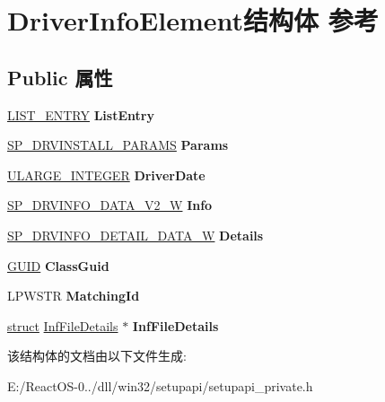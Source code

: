 \hypertarget{struct_driver_info_element}{}\section{Driver\+Info\+Element结构体 参考}
\label{struct_driver_info_element}
\subsection*{Public 属性}
\begin{DoxyCompactItemize}
\item 
\mbox{\label{struct_driver_info_element_a5f227b2496b84536b54402f8da7ff201}} 
\hyperlink{struct___l_i_s_t___e_n_t_r_y}{L\+I\+S\+T\+\_\+\+E\+N\+T\+RY} {\bfseries List\+Entry}
\item 
\mbox{\label{struct_driver_info_element_a9e860a7a714109bc65b21bc94cba1f00}} 
\hyperlink{struct___s_p___d_r_v_i_n_s_t_a_l_l___p_a_r_a_m_s}{S\+P\+\_\+\+D\+R\+V\+I\+N\+S\+T\+A\+L\+L\+\_\+\+P\+A\+R\+A\+MS} {\bfseries Params}
\item 
\mbox{\label{struct_driver_info_element_a8175ee4e9d76944c322ca67713fabc22}} 
\hyperlink{struct___u_l_a_r_g_e___i_n_t_e_g_e_r}{U\+L\+A\+R\+G\+E\+\_\+\+I\+N\+T\+E\+G\+ER} {\bfseries Driver\+Date}
\item 
\mbox{\label{struct_driver_info_element_a72328076feb69c8ec038bf82e8f8ed01}} 
\hyperlink{struct___s_p___d_r_v_i_n_f_o___d_a_t_a___v2___w}{S\+P\+\_\+\+D\+R\+V\+I\+N\+F\+O\+\_\+\+D\+A\+T\+A\+\_\+\+V2\+\_\+W} {\bfseries Info}
\item 
\mbox{\label{struct_driver_info_element_a0be476183e3dbf31bd1b8c55bf2dbf7f}} 
\hyperlink{struct___s_p___d_r_v_i_n_f_o___d_e_t_a_i_l___d_a_t_a___w}{S\+P\+\_\+\+D\+R\+V\+I\+N\+F\+O\+\_\+\+D\+E\+T\+A\+I\+L\+\_\+\+D\+A\+T\+A\+\_\+W} {\bfseries Details}
\item 
\mbox{\label{struct_driver_info_element_afb993f8d408872cc6e2afea31e48d577}} 
\hyperlink{interface_g_u_i_d}{G\+U\+ID} {\bfseries Class\+Guid}
\item 
\mbox{\label{struct_driver_info_element_a78ac91494740647f3229a2d6eb5588b3}} 
L\+P\+W\+S\+TR {\bfseries Matching\+Id}
\item 
\mbox{\label{struct_driver_info_element_a089c999b79ecedbd2563a448667accde}} 
\hyperlink{interfacestruct}{struct} \hyperlink{struct_inf_file_details}{Inf\+File\+Details} $\ast$ {\bfseries Inf\+File\+Details}
\end{DoxyCompactItemize}


该结构体的文档由以下文件生成\+:\begin{DoxyCompactItemize}
\item 
E\+:/\+React\+O\+S-\/0../dll/win32/setupapi/setupapi\+\_\+private.\+h\end{DoxyCompactItemize}
